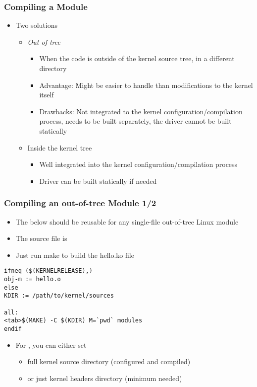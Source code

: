 \begin{frame}
  \frametitle{Compiling a Module}
  \begin{itemize}
  \item Two solutions
    \begin{itemize}
    \item \emph{Out of tree}
      \begin{itemize}
      \item When the code is outside of the kernel source tree, in a
        different directory
      \item Advantage: Might be easier to handle than modifications to
        the kernel itself
      \item Drawbacks: Not integrated to the kernel
        configuration/compilation process, needs to be built
        separately, the driver cannot be built statically
      \end{itemize}
    \item Inside the kernel tree
      \begin{itemize}
      \item Well integrated into the kernel configuration/compilation
        process
      \item Driver can be built statically if needed
      \end{itemize}
    \end{itemize}
  \end{itemize}
\end{frame}

\begin{frame}[fragile]
  \frametitle{Compiling an out-of-tree Module 1/2}
  \begin{itemize}
  \item The below  should be reusable for any single-file
    out-of-tree Linux module
  \item The source file is 
  \item Just run make to build the hello.ko file
  \end{itemize}
\begin{verbatim}
ifneq ($(KERNELRELEASE),)
obj-m := hello.o
else
KDIR := /path/to/kernel/sources

all:
<tab>$(MAKE) -C $(KDIR) M=`pwd` modules
endif
\end{verbatim}

\begin{itemize}
\item For , you can either set
  \begin{itemize}
  \item full kernel source directory (configured and compiled)
  \item or just kernel headers directory (minimum needed)
  \end{itemize}
\end{itemize}
\end{frame}

